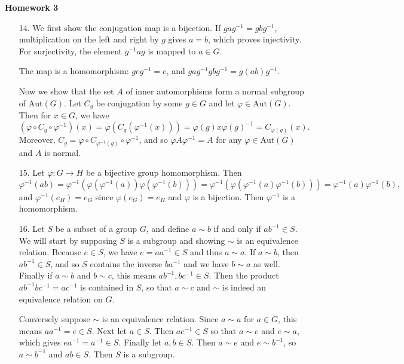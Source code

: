 \documentclass[11pt, reqno]{article}
\theoremstyle{plain}
\theoremstyle{definition}
\theoremstyle{remark}
\renewcommand{\phi}{\varphi}
\begin{document}
\topmargin=-40pt
\renewcommand{\headrulewidth}{1pt}
\renewcommand{\headsep}{20pt}
\thispagestyle{fancy}

{\Huge \bfseries \noindent Homework 3}

\begin{enumerate}
    \item[14.] We first show the conjugation map is a bijection. If $gag^{-1} = gbg^{-1}$, multiplication
    on the left and right by $g$ gives $a = b$, which proves injectivity. For surjectivity, the element
    $g^{-1}ag$ is mapped to $a \in G$.

    The map is a homomorphism: $geg^{-1} = e$, and $gag^{-1}gbg^{-1} = g(ab)g^{-1}$. 

    Now we show that the set $A$ of inner automorphisms form a normal subgroup of $\text{Aut}(G)$. Let $C_g$ be 
    conjugation by some $g \in G$ and let $\phi \in \text{Aut}(G)$. Then for $x \in G$, we have 
    \[
        (\phi\circ C_g \circ \phi^{-1})(x) = \phi(C_g(\phi^{-1}(x))) = \phi(g) x \phi(g)^{-1} = C_{\phi(g)}(x).
    \]
    Moreover, $C_g = \phi \circ C_{\phi^{-1}(g)}\circ \phi^{-1}$, and so $\phi A \phi^{-1} = A$ for any 
    $\phi \in \text{Aut}(G)$ and $A$ is normal.

    \item[15.] Let $\phi: G \rightarrow H$ be a bijective group homomorphism. Then 
    \[
        \phi^{-1}(ab) = \phi^{-1}(\phi(\phi^{-1}(a))\phi(\phi^{-1}(b))) = \phi^{-1}(\phi(\phi^{-1}(a)\phi^{-1}(b)))
        = \phi^{-1}(a)\phi^{-1}(b),
    \]
    and $\phi^{-1}(e_H) = e_G$ since $\phi(e_G) = e_H$ and $\phi$ is a bijection. Then $\phi^{-1}$ is 
    a homomorphism.

    \item[16.] Let $S$ be a subset of a group $G$, and define $a \sim b$ if and only if $ab^{-1} \in S$. 
    We will start by supposing $S$ is a subgroup and showing $\sim$ is an equivalence relation. Because 
    $e \in S$, we have $e = aa^{-1} \in S$ and thus $a \sim a$. If $a \sim b$, then $ab^{-1} \in S$,
    and so $S$ contains the inverse $ba^{-1}$ and we have $b \sim a$ as well. Finally if $a \sim b$ and
    $b \sim c$, this means $ab^{-1}, bc^{-1} \in S$. Then the product $ab^{-1}bc^{-1} = ac^{-1}$ is 
    contained in $S$, so that $a \sim c$ and $\sim$ is indeed an equivalence relation on $G$.

    Conversely suppose $\sim$ is an equivalence relation. Since $a \sim a$ for $a \in G$, this means $aa^{-1} = e \in S$.
    Next let $a \in S$. Then $ae^{-1} \in S$ so that $a \sim e$ and $e \sim a$, which gives $ea^{-1} = a^{-1} \in S$.
    Finally let $a,b \in S$. Then $a \sim e$ and $e \sim b^{-1}$, so $a \sim b^{-1}$ and $ab \in S$. Then $S$ 
    is a subgroup.


\end{enumerate}
\end{document}
